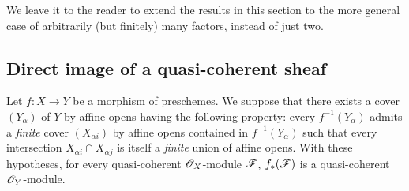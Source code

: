 We leave it to the reader to extend the results in this section to the more
general case of arbitrarily (but finitely) many factors, instead of just two.

\subsection{Direct image of a quasi-coherent sheaf}
\label{subsection-direct-image-of-qcoh}

\begin{prop}[9.2.1]
\label{prop-1.9.2.1}
Let $f:X\to Y$ be a morphism of
preschemes. We suppose that there exists a cover $(Y_\alpha)$ of $Y$ by affine
opens having the following property: every $f^{-1}(Y_\alpha)$ admits a
{\em finite} cover $(X_{\alpha i})$ by affine opens contained in
$f^{-1}(Y_\alpha)$ such that every intersection $X_{\alpha i}\cap X_{\alpha j}$
is itself a {\em finite} union of affine opens. With these hypotheses, for
every quasi-coherent $\mathscr{O}_X$-module $\mathscr{F}$, $f_*(\mathscr{F})$ is a
quasi-coherent $\mathscr{O}_Y$-module.
\end{prop}

